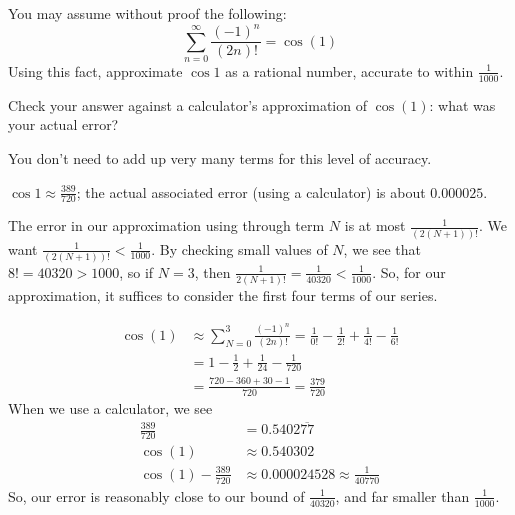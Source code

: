 \begin{Mquestion}
You may assume without proof the following:
\[\sum_{n=0}^\infty \frac{(-1)^n}{(2n)!} = \cos(1)\]
Using this fact, approximate $\cos 1$ as a rational number, accurate to within $\frac1{1000}$.

Check your answer against a calculator's approximation of $\cos(1)$: what was your actual error?
\end{Mquestion}
\begin{hint}
You don't need to add up very many terms for this level of accuracy.
\end{hint}
\begin{answer}
$\cos 1 \approx \frac{389}{720}$; the actual associated error (using a calculator) is about
$0.000025$.
\end{answer}
\begin{solution}
The error in our approximation using through term $N$ is at most $\frac{1}{(2(N+1))!}$. We want $\frac{1}{(2(N+1))!}<\frac{1}{1000}$. By checking small values of $N$, we see that $8!=40320>1000$, so if $N=3$, then $\frac{1}{2(N+1)!}=\frac{1}{40320}<\frac{1}{1000}$. So, for our approximation, it suffices to consider the first four terms of our series.

\begin{align*}
\cos(1)&\approx \sum_{N=0}^3 \frac{(-1)^n}{(2n)!} = \frac{1}{0!}-\frac{1}{2!}+\frac{1}{4!}-\frac{1}{6!}\\
&=1-\frac12+\frac{1}{24}-\frac{1}{720}\\
&=\frac{720-360+30-1}{720}=\frac{379}{720}
\end{align*}
When we use a calculator, we see
\begin{align*}
\frac{389}{720}&=0.5402\overline{77} \\
\cos(1)&\approx  0.540302\\
\cos(1) - \frac{389}{720}&\approx 0.000024528\approx \frac{1}{40770}
\end{align*}
So, our error is reasonably close to our bound of $\frac{1}{40320}$, and far smaller than $\frac{1}{1000}$.
\end{solution}







